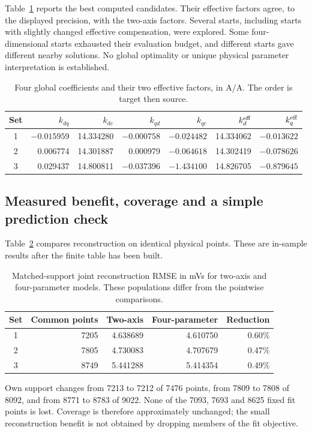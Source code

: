 Table~\ref{tab:four-parameters} reports the best computed candidates. Their effective factors agree, to the displayed precision, with the two-axis factors. Several starts, including starts with slightly changed effective compensation, were explored. Some four-dimensional starts exhausted their evaluation budget, and different starts gave different nearby solutions. No global optimality or unique physical parameter interpretation is established.
\begin{table}[htbp]\centering\small
\caption{Four global coefficients and their two effective factors, in A/A. The order is target then source.}\label{tab:four-parameters}
\setlength{\tabcolsep}{4pt}
\begin{tabular}{crrrrrr}
\toprule
Set & $k_{dq}$ & $k_{de}$ & $k_{qd}$ & $k_{qe}$ & $k_d^{\rm eff}$ & $k_q^{\rm eff}$\\
\midrule
1 & $-0.015959$ & 14.334280 & $-0.000758$ & $-0.024482$ & 14.334062 & $-0.013622$\\
2 & 0.006774 & 14.301887 & 0.000979 & $-0.064618$ & 14.302419 & $-0.078626$\\
3 & 0.029437 & 14.800811 & $-0.037396$ & $-1.434100$ & 14.826705 & $-0.879645$\\
\bottomrule
\end{tabular}
\end{table}

\subsection{Measured benefit, coverage and a simple prediction check}
Table~\ref{tab:four-comparison} compares reconstruction on identical physical points. These are in-sample results after the finite table has been built.
\begin{table}[htbp]\centering\small
\caption{Matched-support joint reconstruction RMSE in mVs for two-axis and four-parameter models. These populations differ from the pointwise comparisons.}\label{tab:four-comparison}
\begin{tabular}{crrrr}
\toprule
Set & Common points & Two-axis & Four-parameter & Reduction\\
\midrule
1 & 7205 & 4.638689 & 4.610750 & 0.60\%\\
2 & 7805 & 4.730083 & 4.707679 & 0.47\%\\
3 & 8749 & 5.441288 & 5.414354 & 0.49\%\\
\bottomrule
\end{tabular}
\end{table}
Own support changes from 7213 to 7212 of 7476 points, from 7809 to 7808 of 8092, and from 8771 to 8783 of 9022. None of the 7093, 7693 and 8625 fixed fit points is lost. Coverage is therefore approximately unchanged; the small reconstruction benefit is not obtained by dropping members of the fit objective.

